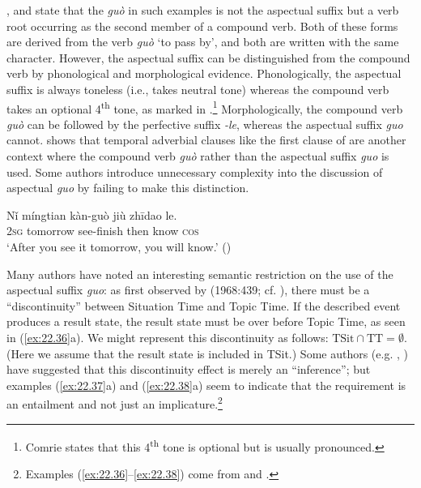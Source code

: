 \citet[251]{Chao1968}, \citet[59]{Comrie1976} and \citet[139ff.]{XiaoMcEnery2004} state that the \textit{guò} in such examples is not the aspectual suffix but a verb root occurring as the second member of a compound verb. Both of these forms are derived from the verb \textit{guò} ‘to pass by’, and both are written with the same  character. However, the aspectual suffix can be distinguished from the compound verb by phonological and morphological evidence. Phonologically, the aspectual suffix is always toneless (i.e., takes neutral tone) whereas the compound verb takes an optional 4\textsuperscript{th} tone, as marked in .\footnote{Comrie states that this 4\textsuperscript{th} tone is optional but is usually pronounced.} Morphologically, the compound verb \textit{guò} can be followed by the perfective suffix \textit{-le}, whereas the aspectual suffix \textit{guo} cannot. \citet[39--40]{Chu1998} shows that temporal adverbial clauses like the first clause of  are another context where the compound verb \textit{guò} rather than the aspectual suffix \textit{guo} is used. Some authors introduce unnecessary complexity into the discussion of aspectual \textit{guo} by failing to make this distinction.


\ea \label{ex:22.35}
\gll Nǐ  míngtian  kàn-guò  jiù  zhīdao  le.\\
\textsc{2sg}  tomorrow  see-finish  then  know  \textsc{cos}\\
\glt ‘After you see it tomorrow, you will know.’  (\citealt{Chen1979})
\z


Many authors have noted an interesting semantic restriction on the use of the aspectual suffix \textit{guo}: as first observed by \citeauthor{Chao1968} (1968:439; cf. \citealt{Yeh1996}), there must be a “discontinuity” between Situation Time and Topic Time. If the described event produces a result state, the result state must be over before Topic Time, as seen in (\ref{ex:22.36}a). We might represent this discontinuity as follows: $\text{TSit} \cap \text{TT} = \emptyset$. (Here we assume that the result state is included in TSit.) Some authors (e.g. \citealt{Iljic1990}, \citealt{Yeh1996}) have suggested that this discontinuity effect is merely an “inference”; but examples (\ref{ex:22.37}a) and (\ref{ex:22.38}a) seem to indicate that the requirement is an entailment and not just an implicature.\footnote{Examples (\ref{ex:22.36}--\ref{ex:22.38}) come from \citet[18, 25]{Ma1977} and \citet{Chao1968}.}


